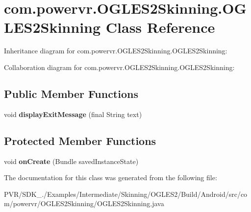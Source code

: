 \hypertarget{classcom_1_1powervr_1_1_o_g_l_e_s2_skinning_1_1_o_g_l_e_s2_skinning}{\section{com.\+powervr.\+O\+G\+L\+E\+S2\+Skinning.\+O\+G\+L\+E\+S2\+Skinning Class Reference}
\label{classcom_1_1powervr_1_1_o_g_l_e_s2_skinning_1_1_o_g_l_e_s2_skinning}
}


Inheritance diagram for com.\+powervr.\+O\+G\+L\+E\+S2\+Skinning.\+O\+G\+L\+E\+S2\+Skinning\+:


Collaboration diagram for com.\+powervr.\+O\+G\+L\+E\+S2\+Skinning.\+O\+G\+L\+E\+S2\+Skinning\+:
\subsection*{Public Member Functions}
\begin{DoxyCompactItemize}
\item 
\hypertarget{classcom_1_1powervr_1_1_o_g_l_e_s2_skinning_1_1_o_g_l_e_s2_skinning_af377ddc430e7a9500e1f5386bde80f14}{void {\bfseries display\+Exit\+Message} (final String text)}\label{classcom_1_1powervr_1_1_o_g_l_e_s2_skinning_1_1_o_g_l_e_s2_skinning_af377ddc430e7a9500e1f5386bde80f14}

\end{DoxyCompactItemize}
\subsection*{Protected Member Functions}
\begin{DoxyCompactItemize}
\item 
\hypertarget{classcom_1_1powervr_1_1_o_g_l_e_s2_skinning_1_1_o_g_l_e_s2_skinning_a40238906d74db961827ffcb3cb2f55d7}{void {\bfseries on\+Create} (Bundle saved\+Instance\+State)}\label{classcom_1_1powervr_1_1_o_g_l_e_s2_skinning_1_1_o_g_l_e_s2_skinning_a40238906d74db961827ffcb3cb2f55d7}

\end{DoxyCompactItemize}


The documentation for this class was generated from the following file\+:\begin{DoxyCompactItemize}
\item 
P\+V\+R/\+S\+D\+K\+\_./\+Examples/\+Intermediate/\+Skinning/\+O\+G\+L\+E\+S2/\+Build/\+Android/src/com/powervr/\+O\+G\+L\+E\+S2\+Skinning/O\+G\+L\+E\+S2\+Skinning.\+java\end{DoxyCompactItemize}
